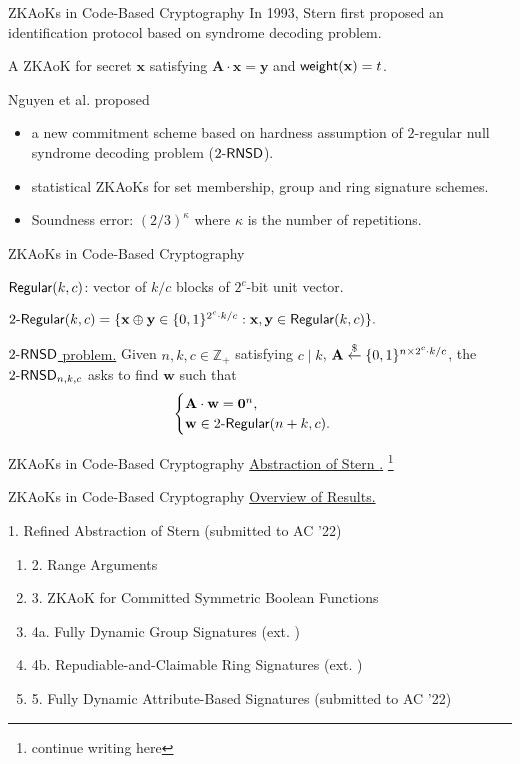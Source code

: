 \begin{frame}{ZKAoKs in Code-Based Cryptography}
	In 1993, Stern first proposed an identification protocol \cite{Stern93} based on syndrome decoding problem.\pause
	
	A ZKAoK for secret $\mathbf{x}$ satisfying $\mathbf{A}\cdot\mathbf{x} = \mathbf{y}$ and $\mathsf{weight}(\mathbf{x}) = t$. \pause
	
	Nguyen et al. \cite{NguyenTWZ19, NguyenTWZ19eprint} proposed \pause
	\begin{itemize}
		\item a new commitment scheme based on hardness assumption of $2$-regular null syndrome decoding problem (${2\textsf{-}\mathsf{RNSD}}$).\pause
		\item statistical ZKAoKs for set membership, group and ring signature schemes.\pause 
		\item Soundness error: $(2/3)^\kappa$ where $\kappa$ is the number of repetitions.
	\end{itemize}
\end{frame}

\begin{frame}{ZKAoKs in Code-Based Cryptography}
	
		$\mathsf{Regular}(k,c)$: vector of $k/c$ blocks of $2^c$-bit unit vector.
	
		$2\textsf{-}\mathsf{Regular}(k,c) = \{\mathbf{x}\oplus\mathbf{y} \in \{0,1\}^{2^c\cdot k / c} : \mathbf{x}, \mathbf{y} \in \mathsf{Regular}(k, c)\}.$
	
		\underline{${2\textsf{-}\mathsf{RNSD}}$ problem.}  Given $n, k, c \in \mathbb{Z}_+$ satisfying $c \mid k$, $\mathbf{A}\stackrel{\$}{\leftarrow}\{0,1\}^{n\times 2^c\cdot k/c}$, the ${2\textsf{-}\mathsf{RNSD}}_{n,k,c}$ asks to find $\mathbf{w}$ such that $$\begin{cases}
			\mathbf{A}\cdot \mathbf{w} = \mathbf{0}^{n},\\
			\mathbf{w}\in2\textsf{-}\mathsf{Regular}(n+ k,c).
		\end{cases}$$
\end{frame}
\begin{frame}{ZKAoKs in Code-Based Cryptography}
	\underline{Abstraction of Stern \cite{NguyenTWZ19}.} \footnote{continue writing here}
\end{frame}

\begin{frame}{ZKAoKs in Code-Based Cryptography}
	\underline{Overview of Results.}\pause
	
	{\small 1. Refined Abstraction of Stern (submitted to AC '22)}\pause
	\begin{enumerate}[$\Rightarrow$]
		\item {\small 2. Range Arguments \cite{NguyenTWZ19}}\pause
		\item {\small 3. ZKAoK for Committed Symmetric Boolean Functions \cite{LingNPTW21}}\pause
		\item {\small 4a. Fully Dynamic Group Signatures (ext. \cite{NguyenTWZ19})}\pause
		\item {\small 4b. Repudiable-and-Claimable Ring Signatures (ext. \cite{NguyenTWZ19})}\pause
		\item {\small 5. Fully Dynamic Attribute-Based Signatures (submitted to AC '22)}
	\end{enumerate}
\end{frame}